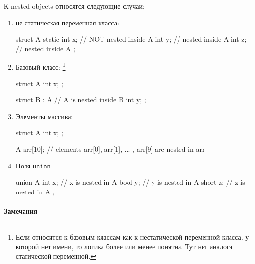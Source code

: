 \documentclass{article}
\begin{document}
К nested objects относятся следующие случаи:
\begin{enumerate}
\item не статическая переменная класса:
\begin{cppcode}[\nonumbers]
struct A {
  static int x; // NOT nested inside A
  int y;        // nested inside A
  int z;        // nested inside A
};
\end{cppcode}

\item Базовый класс:%
\footnote{Если относится к базовым классам как к нестатической переменной класса, у которой нет имени, то логика более или менее понятна.
Тут нет аналога статической переменной.}
\begin{cppcode}[\nonumbers]
struct A {
  int x;
};

struct B : A { // A is nested inside B
  int y;
};
\end{cppcode}

\item Элементы массива:
\begin{cppcode}[\nonumbers]
struct A {
  int x;
};

A arr[10]; // elements arr[0], arr[1], ... , arr[9] are nested in arr
\end{cppcode}

\item Поля \verb"union":
\begin{cppcode}[\nonumbers]
union A {
  int x;   // x is nested in A
  bool y;  // y is nested in A
  short z; // z is nested in A
};
\end{cppcode}
\end{enumerate}

\paragraph{Замечания}
\end{document}
